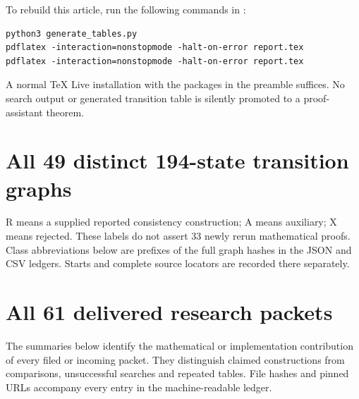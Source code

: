 \documentclass[11pt,letterpaper]{article}
\newcommand{\file}[1]{\path{#1}}
\begin{document}
To rebuild this article, run the following commands in \file{report/}:
\begin{verbatim}
python3 generate_tables.py
pdflatex -interaction=nonstopmode -halt-on-error report.tex
pdflatex -interaction=nonstopmode -halt-on-error report.tex
\end{verbatim}
A normal TeX Live installation with the packages in the preamble suffices.
No search output or generated transition table is silently promoted to a
proof-assistant theorem.

\appendix
\section{All 49 distinct 194-state transition graphs}
\label{app:frontier}

R means a supplied reported consistency construction; A means auxiliary;
X means rejected. These labels do not assert 33 newly rerun mathematical
proofs. Class abbreviations below are prefixes of the full graph hashes
in the JSON and CSV ledgers. Starts and complete source locators are
recorded there separately.


\section{All 61 delivered research packets}
\label{app:packets}

The summaries below identify the mathematical or implementation contribution
of every filed or incoming packet. They distinguish claimed constructions
from comparisons, unsuccessful searches and repeated tables. File hashes
and pinned URLs accompany every entry in the machine-readable ledger.

\end{document}
